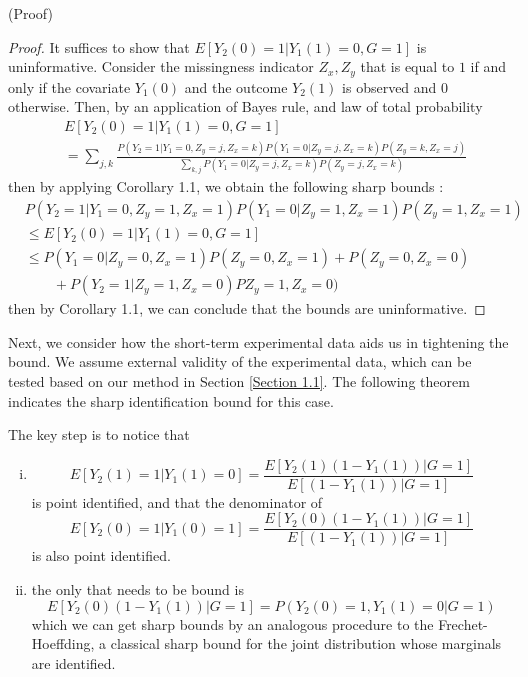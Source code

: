 \documentclass{article}
\begin{document}
(Proof)
\begin{proof}
    It suffices to show that $E[ Y_2(0) =1| Y_1(1)=0, G=1]$ is uninformative. Consider the missingness indicator $Z_x, Z_y$ that is equal to $1$ if and only if the covariate $Y_1(0)$ and the outcome $Y_2(1)$ is observed and $0$ otherwise. Then, by an application of Bayes rule, and law of total probability
    \begin{align}
    &E[ Y_2(0)=1 | Y_1(1)=0, G=1] \\
    &= \sum_{j,k} \frac{ P (Y_2 =1 | Y_1 = 0 , Z_y = j, Z_ x = k ) P ( Y_1 = 0 | Z_y =j,Z_ x =k ) P( Z_y = k, Z_x = j) }{ \sum_{ k, j} P( Y_1 = 0 | Z_y = j, Z_x = k ) P (Z_y = j, Z_x = k) }
    \end{align}
    then by applying \cite{horowitz and manski 1995} Corollary 1.1, we obtain the following sharp bounds :
    \begin{align}
    & P(Y_2 =1 | Y_1 =0, Z_y =1, Z_ x =1 ) P( Y_1 = 0 | Z_y =1, Z_x = 1 )P( Z_y = 1, Z_x =1)\\
    &\leq E[ Y_2(0)=1 | Y_1(1)=0, G=1] \\
    &\leq P( Y_1 = 0 | Z_y = 0 ,Z_x = 1) P( Z_y = 0 , Z_x =1 ) + P( Z_y = 0, Z _ x = 0) \\
    &\qquad+ P( Y_2 =1 | Z_y = 1, Z_ x =0) P  Z_ y =1, Z_x = 0)
    \end{align} 
    then by \cite{horowitz and manski 2000} Corollary 1.1, we can conclude that the bounds are uninformative.
\end{proof}







Next, we consider how the short-term experimental data aids us in tightening the bound. We assume external validity of the experimental data, which can be tested based on our method in Section \ref{Section 1.1}. The following theorem indicates the sharp identification bound for this case.

The key step is to notice that
\begin{enumerate}[(i)]
    \item \[E[ Y_2(1)=1 | Y_1(1)=0]=\frac{E[Y_2(1)(1-Y_1(1))|G=1 ]}{ E[(1-Y_1(1))|G=1]}\]
    is point identified, and that the denominator of 
    \[E[ Y_2(0)=1| Y_1(0)=1 ] = \frac{E[Y_2(0)(1-Y_1(1))|G=1 ]}{ E[(1-Y_1(1))|G=1]}\]
    is also point identified.
    \item the only that needs to be bound is \[E[Y_2(0)(1-Y_1(1))|G=1 ] = P( Y_2(0) =1, Y_1(1)=0|G=1)\] 
    which we can get sharp bounds by an analogous procedure to the Frechet-Hoeffding, a classical sharp bound for the joint distribution whose marginals are identified.
\end{enumerate}
\end{document}
